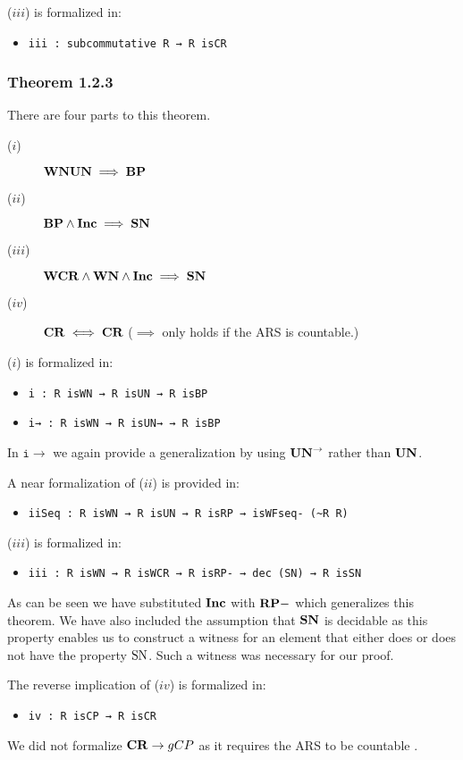 ($iii$) is formalized in:
\begin{itemize}
    \item \verb|iii : subcommutative R → R isCR|
\end{itemize}

\subsubsection{Theorem 1.2.3}
There are four parts to this theorem. 
\begin{description}
    \item[($i$)] $\gWN \and \gUN \implies \gBP$
    \item[($ii$)] $\mathbf{BP} \land \mathbf{Inc} \implies \mathbf{SN}$  
    \item[($iii$)] $\mathbf{WCR} \land \mathbf{WN} \land \mathbf{Inc} \implies \mathbf{SN}$
    \item[($iv$)] $\mathbf{CR} \iff \mathbf{CR}$ ($\implies$ only holds if the ARS is countable.)
\end{description}
($i$) is formalized in: 
\begin{itemize}
    \item \verb|i : R isWN → R isUN → R isBP|
    \item \verb|i→ : R isWN → R isUN→ → R isBP|
\end{itemize}
In $\mathtt{i\to}$ we again provide a generalization by using $\mathbf{UN}^{\to}$ rather than $\mathbf{UN}$.

A near formalization of ($ii$) is provided in: 
\begin{itemize}
    \item \verb|iiSeq : R isWN → R isUN → R isRP → isWFseq- (~R R)|
\end{itemize}

($iii$) is formalized in: 
\begin{itemize}
    \item \verb|iii : R isWN → R isWCR → R isRP- → dec (SN) → R isSN|
\end{itemize}
As can be seen we have substituted $\mathbf{Inc}$ with $\mathbf{RP-}$ which generalizes this theorem. We have also included the assumption that $\mathbf{SN}$ 
is decidable  as this property enables us 
to construct a witness for an element that either does or does not have the property $\mathrm{SN}$. Such a witness was necessary for our proof. 


The reverse implication of ($iv$) is formalized in: 
\begin{itemize}
    \item \verb|iv : R isCP → R isCR|
\end{itemize}
We did not formalize $\mathbf{CR} \to gCP$ as it requires the ARS to be countable .


